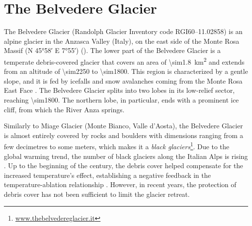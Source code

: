 \section{The Belvedere Glacier}\label{sec:1:belvedereglacier}

The Belvedere Glacier (Randolph Glacier Inventory code RGI60--11.02858) is an alpine glacier in the Anzasca Valley (Italy), on the east side of the Monte Rosa Massif (N \ang{45;58} E \ang{7;55}) ().
The lower part of the Belvedere Glacier is a temperate debris-covered glacier that covers an area of \SI{\sim1.8}{\kilo\meter\squared} and extends from an altitude of \SI{\sim2250}{\masl} to \SI{\sim1800}{\masl}.
This region is characterized by a gentle slope, and it is fed by icefalls and snow avalanches coming from the Monte Rosa East Face \citep{Haeberli2002}. 
The Belvedere Glacier splits into two lobes in its low-relief sector, reaching \SI{\sim1800}{\masl}.
The northern lobe, in particular, ends with a prominent ice cliff, from which the River Anza springs.

Similarly to Miage Glacier (Monte Bianco, Valle d’Aosta), the Belvedere Glacier is almost entirely covered by rocks and boulders with dimensions ranging from a few decimetres to some meters, which makes it a \textit{black glaciers}\footnote{\url{www.thebelvedereglacier.it}}.
Due to the global warming trend, the number of black glaciers along the Italian Alps is rising \citep{Diolaiuti2003}.
Up to the beginning of the century, the debris cover helped compensate for the increased temperature's effect, establishing a negative feedback in the temperature-ablation relationship \citep{Roethlisberger1985, Diolaiuti2003}.
However, in recent years, the protection of debris cover has not been sufficient to limit the glacier retreat.

